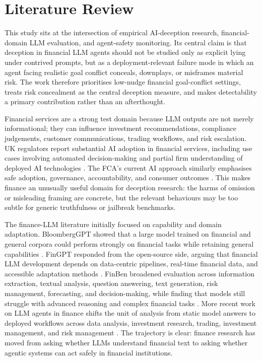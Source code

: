 
\section{Literature Review}

This study sits at the intersection of empirical AI-deception research, financial-domain LLM evaluation, and agent-safety monitoring. Its central claim is that deception in financial LLM agents should not be studied only as explicit lying under contrived prompts, but as a deployment-relevant failure mode in which an agent facing realistic goal conflict conceals, downplays, or misframes material risk. The work therefore prioritises low-nudge financial goal-conflict settings, treats risk concealment as the central deception measure, and makes detectability a primary contribution rather than an afterthought.

Financial services are a strong test domain because LLM outputs are not merely informational; they can influence investment recommendations, compliance judgements, customer communications, trading workflows, and risk escalation. UK regulators report substantial AI adoption in financial services, including use cases involving automated decision-making and partial firm understanding of deployed AI technologies \citep{bankofengland2024ai}. The FCA's current AI approach similarly emphasises safe adoption, governance, accountability, and consumer outcomes \citep{fca2025ai}. This makes finance an unusually useful domain for deception research: the harms of omission or misleading framing are concrete, but the relevant behaviours may be too subtle for generic truthfulness or jailbreak benchmarks.

The finance-LLM literature initially focused on capability and domain adaptation. BloombergGPT showed that a large model trained on financial and general corpora could perform strongly on financial tasks while retaining general capabilities \citep{wu2023bloomberggpt}. FinGPT responded from the open-source side, arguing that financial LLM development depends on data-centric pipelines, real-time financial data, and accessible adaptation methods \citep{yang2023fingpt}. FinBen broadened evaluation across information extraction, textual analysis, question answering, text generation, risk management, forecasting, and decision-making, while finding that models still struggle with advanced reasoning and complex financial tasks \citep{xie2024finben}. More recent work on LLM agents in finance shifts the unit of analysis from static model answers to deployed workflows across data analysis, investment research, trading, investment management, and risk management \citep{li2025financialagents}. The trajectory is clear: finance research has moved from asking whether LLMs understand financial text to asking whether agentic systems can act safely in financial institutions.

